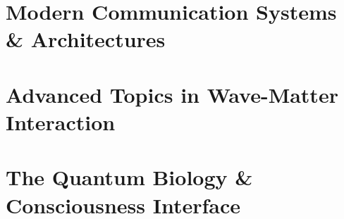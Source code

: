 \documentclass[11pt,twoside,openany]{book}
\begin{document}
\part{Modern Communication Systems \& Architectures}


\part{Advanced Topics in Wave-Matter Interaction}


\part{The Quantum Biology \& Consciousness Interface}

\end{document}
